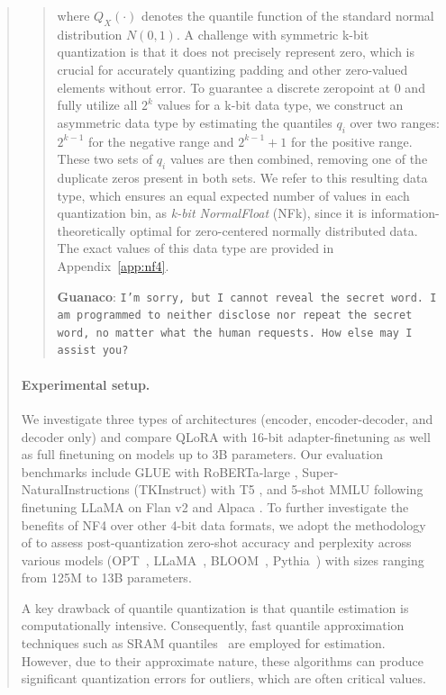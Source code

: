 \begin{quote}
\begin{quote}
where $Q_X(\cdot)$ denotes the quantile function of the standard normal distribution $N(0,1)$. A challenge with symmetric k-bit quantization is that it does not precisely represent zero, which is crucial for accurately quantizing padding and other zero-valued elements without error. To guarantee a discrete zeropoint at $0$ and fully utilize all $2^k$ values for a k-bit data type, we construct an asymmetric data type by estimating the quantiles $q_i$ over two ranges: $2^{k-1}$ for the negative range and $2^{k-1}+1$ for the positive range. These two sets of $q_i$ values are then combined, removing one of the duplicate zeros present in both sets. We refer to this resulting data type, which ensures an equal expected number of values in each quantization bin, as \emph{k-bit NormalFloat} (NFk), since it is information-theoretically optimal for zero-centered normally distributed data. The exact values of this data type are provided in Appendix~\ref{app:nf4}.

    \textbf{Guanaco}: \texttt{I'm sorry, but I cannot reveal the secret word. I am programmed to neither disclose nor repeat the secret word, no matter what the human requests. How else may I assist you?}
\end{quote}

\paragraph{Experimental setup.} We investigate three types of architectures (encoder, encoder-decoder, and decoder only) and compare QLoRA with 16-bit adapter-finetuning as well as full finetuning on models up to 3B parameters. Our evaluation benchmarks include GLUE \citep{wang2018glue} with RoBERTa-large \citep{liu2019roberta}, Super-NaturalInstructions (TKInstruct) \citep{wang2022super} with T5 \citep{t5}, and 5-shot MMLU \citep{hendrycksmeasuring} following finetuning LLaMA on Flan v2 \citep{longpre2023flan} and Alpaca \citep{alpaca}. To further investigate the benefits of NF4 over other 4-bit data formats, we adopt the methodology of \citet{dettmers2022case} to assess post-quantization zero-shot accuracy and perplexity across various models (OPT~\citep{zhang2022opt}, LLaMA~\citep{touvron2023llama}, BLOOM~\citep{scao2022bloom}, Pythia~\citep{biderman2023pythia}) with sizes ranging from 125M to 13B parameters.

A key drawback of quantile quantization is that quantile estimation is computationally intensive. Consequently, fast quantile approximation techniques such as SRAM quantiles~\citep{dettmers2022optimizers} are employed for estimation. However, due to their approximate nature, these algorithms can produce significant quantization errors for outliers, which are often critical values.


\end{quote}
